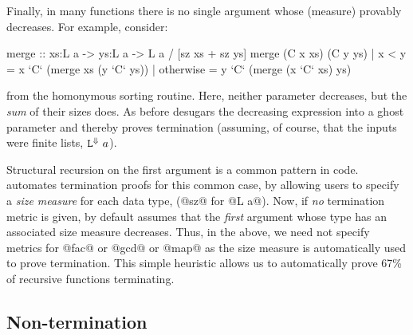 Finally, in many functions there is no single argument 
whose (measure) provably decreases. For example, consider:
%
\begin{code}
  merge :: xs:L a -> ys:L a -> L a / [sz xs + sz ys]
  merge (C x xs) (C y ys)
    | x < y     = x `C` (merge xs  (y `C` ys))
    | otherwise = y `C` (merge (x `C` xs)  ys)
\end{code}
%
from the homonymous sorting routine. Here, neither parameter
decreases, but the \emph{sum} of their sizes does. 
%
As before \toolname desugars the decreasing expression into 
a ghost parameter and thereby proves termination (assuming, 
of course, that the inputs were finite lists, \ie 
${\mathtt{L}}^{\Downarrow}\ a$).

Structural recursion on the first argument is a common pattern 
in \lhaskell code.
%
\toolname automates termination proofs for this common case,
by allowing users to specify a \emph{size measure} 
for each data type, (\eg @sz@ for @L a@).
%
Now, if \emph{no} termination metric is given, by default 
\toolname assumes that the \emph{first} argument whose type
has an associated size measure decreases.
%
Thus, in the above, we need not specify metrics for @fac@ 
or @gcd@ or @map@ as the size measure is automatically 
used to prove termination. 
%
This simple heuristic allows us to {automatically}
prove 67\% of recursive functions terminating.


\subsection{Non-termination}

